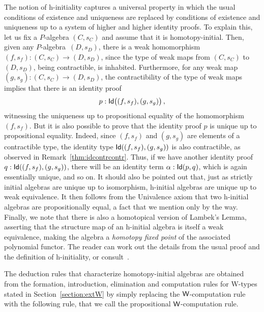\begin{remark} 
The notion of h-initiality captures a universal property in which the usual conditions of existence and uniqueness  are replaced by conditions of existence and uniqueness up to a system of higher and higher identity proofs. To explain this, let us fix a $P$-algebra  $(C,s_C)$ and assume that it is homotopy-initial. Then, given any 
$P$-algebra~$(D,s_D)$, there is a weak homomorphism $(f,s_f) : (C,s_C) \rightarrow (D,s_D)$, since
the type of weak maps from $(C,s_C)$ to $(D,s_D)$, being contractible, is inhabited. Furthermore, for any weak map $(g,s_g) : (C,s_C) \rightarrow (D,s_D)$, the
contractibility of the type of weak maps  implies that there is an identity proof 
\[
 p  : \mathsf{Id}\big( (f,s_f), (g, s_g) \big) \, , 
\]
witnessing the uniqueness up to propositional equality of the homomorphism $(f,s_f)$. But it
is also possible to prove that the identity proof $p$ is unique up to propositional equality. Indeed, since 
$(f,s_f)$ and $(g,s_g)$ are elements of a contractible type, the identity type $\mathsf{Id}( (f,s_f), (g, s_g) )$ 
is also contractible, as observed in Remark~\ref{thm:idcontrcontr}. Thus, if we have another 
identity proof $q : \mathsf{Id}( (f,s_f), (g, s_g) )$, there will be an identity term $\alpha : \mathsf{Id}(p,q)$, which is again
essentially unique, and so on.  It should also be pointed out that, just as strictly initial algebras are unique
up to isomorphism, h-initial algebras are unique up to weak equivalence. It then follows from
the Univalence axiom that two h-initial algebras are propositionally equal, a fact that we mention only by the way. Finally, we note that there is also a homotopical version of Lambek's Lemma, asserting that the structure map of an h-initial algebra is itself a weak equivalence, making the algebra a \emph{homotopy fixed point} of the associated polynomial functor. The reader can work out the details from the usual proof and the definition of  h-initiality, or consult~\cite{AwodeyS:indtht}.
\end{remark}

\medskip

The deduction rules that characterize homotopy-initial algebras are
obtained from the formation, introduction, elimination and computation rules for W-types 
stated in Section~\ref{section:extW} by simply replacing the $\mathsf{W}$-computation rule with the
following rule, that we call the propositional $\mathsf{W}$-computation rule.

\smallskip


